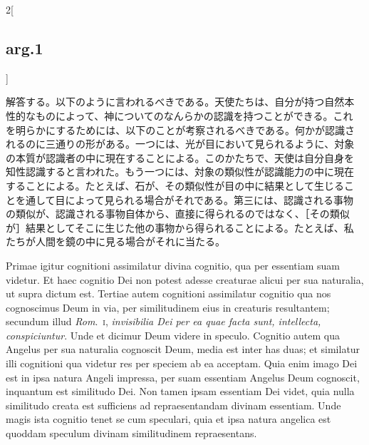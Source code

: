 \documentclass[paper=a4paper,fontsize=10pt,jafontsize=9pt,titlepage]{jlreq}
\begin{document}
\begin{paracol}{2}[\subsection{arg.1}]
\switchcolumn

解答する。以下のように言われるべきである。天使たちは、自分が持つ自然本
性的なものによって、神についてのなんらかの認識を持つことができる。これ
を明らかにするためには、以下のことが考察されるべきである。何かが認識さ
れるのに三通りの形がある。一つには、光が目において見られるように、対象
の本質が認識者の中に現在することによる。このかたちで、天使は自分自身を
知性認識すると言われた。もう一つには、対象の類似性が認識能力の中に現在
することによる。たとえば、石が、その類似性が目の中に結果として生じるこ
とを通して目によって見られる場合がそれである。第三には、認識される事物
の類似が、認識される事物自体から、直接に得られるのではなく、［その類似
が］結果としてそこに生じた他の事物から得られることによる。たとえば、私
たちが人間を鏡の中に見る場合がそれに当たる。

\switchcolumn*

Primae igitur cognitioni assimilatur divina cognitio, qua per
essentiam suam videtur. Et haec cognitio Dei non potest adesse
creaturae alicui per sua naturalia, ut supra dictum est. Tertiae autem
cognitioni assimilatur cognitio qua nos cognoscimus Deum in via, per
similitudinem eius in creaturis resultantem; secundum illud {\itshape
Rom}.~{\scshape i}, {\itshape invisibilia Dei per ea quae facta sunt,
intellecta, conspiciuntur}. Unde et dicimur Deum videre in
speculo. Cognitio autem qua Angelus per sua naturalia cognoscit Deum,
media est inter has duas; et similatur illi cognitioni qua videtur res
per speciem ab ea acceptam. Quia enim imago Dei est in ipsa natura
Angeli impressa, per suam essentiam Angelus Deum cognoscit, inquantum
est similitudo Dei. Non tamen ipsam essentiam Dei videt, quia nulla
similitudo creata est sufficiens ad repraesentandam divinam
essentiam. Unde magis ista cognitio tenet se cum speculari, quia et
ipsa natura angelica est quoddam speculum divinam similitudinem
repraesentans.

\switchcolumn


\end{paracol}
\end{document}
